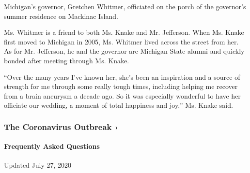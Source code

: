 Michigan's governor, Gretchen Whitmer, officiated on the porch of the
governor's summer residence on Mackinac Island.

Ms. Whitmer is a friend to both Ms. Knake and Mr. Jefferson. When Ms.
Knake first moved to Michigan in 2005, Ms. Whitmer lived across the
street from her. As for Mr. Jefferson, he and the governor are Michigan
State alumni and quickly bonded after meeting through Ms. Knake.

``Over the many years I've known her, she's been an inspiration and a
source of strength for me through some really tough times, including
helping me recover from a brain aneurysm a decade ago. So it was
especially wonderful to have her officiate our wedding, a moment of
total happiness and joy,'' Ms. Knake said.

\href{https://www.nytimes.com/news-event/coronavirus?action=click\&pgtype=Article\&state=default\&region=MAIN_CONTENT_3\&context=storylines_faq}{}

\hypertarget{the-coronavirus-outbreak-}{%
\subsubsection{The Coronavirus Outbreak
›}\label{the-coronavirus-outbreak-}}

\hypertarget{frequently-asked-questions}{%
\paragraph{Frequently Asked
Questions}\label{frequently-asked-questions}}

Updated July 27, 2020

